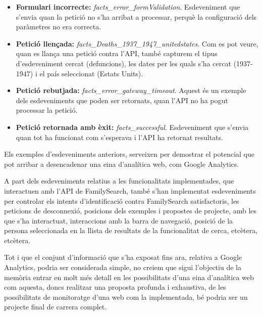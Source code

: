     \begin{itemize}
        \item \textbf{Formulari incorrecte:} \emph{facts\_error\_formValidation}. Esdeveniment que s'en\-via quan la petició no s'ha arribat a processar, perquè la configuració dels paràmetres no era correcta.
        \item \textbf{Petició llençada:} \emph{facts\_Deaths\_1937\_1947\_unitedstates}. Com es pot veure, quan es llança una petició contra l'API, també capturem el tipus d'esdeveniment cercat (defuncions), les dates per les quals s'ha cercat (1937-1947) i el país seleccionat (Estats Units).
        \item \textbf{Petició rebutjada:} \emph{facts\_error\_gateway\_timeout}. Aquest és un exemple dels esdeveniments que poden ser retornats, quan l'API no ha pogut processar la petició.
        \item \textbf{Petició retornada amb èxit:} \emph{facts\_successful}. Esdeveniment que s'envia quan tot ha funcionat com s'esperava i l'API ha retornat resultats.
    \end{itemize}

    Els exemples d'esdeveniments anteriors, serveixen per demostrar el potencial que pot arribar a desencadenar una eina d'analítica web, com Google Analytics.

    A part dels esdeveniments relatius a les funcionalitats implementades, que interactuen amb l'API de FamilySearch, també s'han implementat esdeveniments per controlar els intents d'identificació contra FamilySearch satisfactoris, les peticions de desconnexió, posicions dels exemples i propostes de projecte, amb les que s'ha inte\-rac\-tuat, interaccions amb la barra de navegació, posició de la persona seleccionada en la llista de resultats de la funcionalitat de cerca, etcètera, etcètera.

    Tot i que el conjunt d'informació que s'ha exposat fins ara, relativa a Google Analy\-tics, podria ser considerada simple, no creiem que sigui l'objectiu de la memòria entrar en molt més detall en les possibilitats d'una eina d'analítica web com aquesta, doncs realitzar una proposta profunda i exhaustiva, de les possibilitats de monitoratge d'una web com la implementada, bé podria ser un projecte final de carrera complet.
